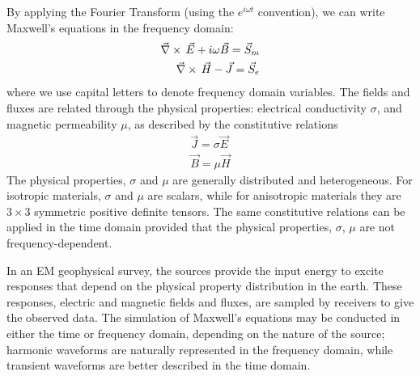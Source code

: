 By applying the Fourier Transform (using the $e^{i\omega t}$ convention), we can write Maxwell's equations in the frequency domain:
\begin{equation}
\begin{split}
{\vec \nabla}\times\, \vec{E} + i\omega\vec{B} = \vec{S}_m \\
{\vec \nabla}\times\, \vec{H} - \vec{J} = \vec{S}_e
\end{split}
\label{eq:MaxwellBasicFreq}
\end{equation}
where we use capital letters to denote frequency domain variables. The fields and fluxes are  related through the physical properties: electrical conductivity $\sigma$, and magnetic permeability $\mu$, as described by the constitutive relations
\begin{equation}
\begin{split}
\vec{J} = \sigma \vec{E} \\
\vec{B} = \mu \vec{H}
\end{split}
\label{eq:ConstitutiveRelations}
\end{equation}
The physical properties, $\sigma$ and $\mu$ are generally distributed and heterogeneous. For isotropic materials, $\sigma$ and $\mu$ are scalars, while for anisotropic materials they are $3\times3$ symmetric positive definite tensors. The same constitutive relations can be applied in the time domain provided that the physical properties, $\sigma$, $\mu$ are not frequency-dependent.

In an EM geophysical survey, the sources provide the input energy to excite responses that depend on the physical property distribution in the earth. These responses, electric and magnetic fields and fluxes, are sampled by receivers to give the observed data. The simulation of Maxwell's equations may be conducted in either the time or frequency domain, depending on the nature of the source; harmonic waveforms are naturally  represented in the frequency domain, while transient waveforms are better described in the time domain.

